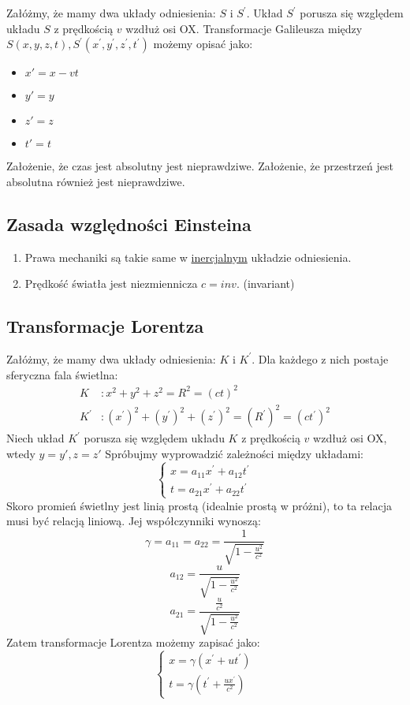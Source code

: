 \documentclass{article}
\theoremstyle{definition}
\theoremstyle{definition}
\theoremstyle{definition}
\theoremstyle{definition}
\begin{document}
Załóżmy, że mamy dwa układy odniesienia: $S$ i $S^\prime$. Układ $S^\prime$ porusza się względem układu $S$ z prędkością $v$ wzdłuż osi OX.
Transformacje Galileusza między $S(x,y,z,t), S^\prime(x^\prime,y^\prime,z^\prime,t^\prime)$ możemy opisać jako:
\begin{itemize}
    \item $x' = x-vt$
    \item $y' = y$
    \item $z' = z$
    \item $t' = t$
\end{itemize}
Założenie, że czas jest absolutny jest nieprawdziwe.
Założenie, że przestrzeń jest absolutna również jest nieprawdziwe.

\subsection{Zasada względności Einsteina}

\begin{enumerate}
\item Prawa mechaniki są takie same w \underline{inercjalnym} układzie odniesienia.
\item Prędkość światła jest niezmiennicza $c=inv.$ (invariant)
\end{enumerate}

\subsection{Transformacje Lorentza}

Załóżmy, że mamy dwa układy odniesienia: $K$ i $K^\prime$. Dla każdego z nich postaje sferyczna fala świetlna:
\begin{align}
K&: x^2 + y^2 + z^2 = R^2 = (ct)^2\\
K^\prime &: (x^\prime)^2 + (y^\prime)^2 + (z^\prime)^2 = (R^\prime)^2 = (ct^\prime)^2
\end{align}
Niech układ $K^\prime$ porusza się względem układu $K$ z prędkością $v$ wzdłuż osi OX, wtedy $y=y', z=z'$
Spróbujmy wyprowadzić zależności między układami:\
\[
\begin{cases}
x = a_{11} x^\prime + a_{12} t^\prime\\
t = a_{21} x^\prime + a_{22} t^\prime
\end{cases}
\]
Skoro promień świetlny jest linią prostą (idealnie prostą w próżni), to ta relacja musi być relacją liniową. Jej współczynniki wynoszą:
\[\gamma=a_{11}=a_{22}=\frac{1}{\sqrt{1-\frac{u^2}{c^2}}}\]
\[a_{12}=\frac{u}{\sqrt{1-\frac{u^2}{c^2}}}\]
\[a_{21}=\frac{\frac{u}{c^2}}{\sqrt{1-\frac{u^2}{c^2}}}\]
Zatem transformacje Lorentza możemy zapisać jako:
\[
\begin{cases}
x = \gamma(x^\prime + ut^\prime)\\
t = \gamma(t^\prime + \frac{ux^\prime}{c^2})
\end{cases}
\]
\end{document}
